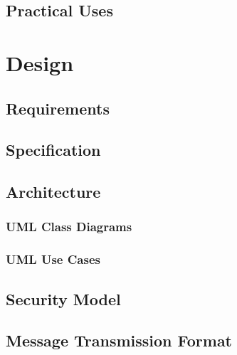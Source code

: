 \documentclass[a4paper,12pt]{report}
\begin{document}


\section{Practical Uses}




\chapter{Design}

\section{Requirements}



\section{Specification}



\section{Architecture}



\subsection{UML Class Diagrams}





\subsection{UML Use Cases}



\section{Security Model}



\section{Message Transmission Format}
\end{document}
